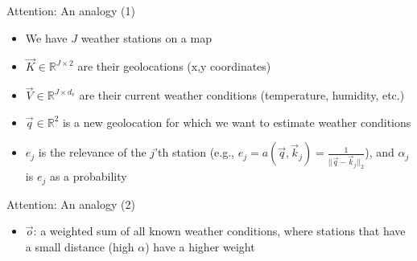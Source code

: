 
\begin{vbframe}{Attention: An analogy (1)}

\vfill

\begin{itemize}
\item We have $J$ weather stations on a map
\item $\vec K \in \mathbb{R}^{J\times 2}$ are their geolocations (x,y coordinates)
\item $\vec V \in \mathbb{R}^{J \times d_v}$ are their current weather conditions (temperature, humidity, etc.)
\item $\vec q \in \mathbb{R}^2$ is a new geolocation for which we want to estimate weather conditions
\item $e_j$ is the relevance of the $j$'th station (e.g., $e_j = a(\vec q, \vec k_j) = \frac{1}{||\vec q - \vec k_j||_2}$), and $\alpha_j$ is $e_j$ as a probability
\end{itemize}

\vfill

\end{vbframe}


\begin{vbframe}{Attention: An analogy (2)}

\vfill

\begin{itemize}
\item $\vec o$: a weighted sum of all known weather conditions, where stations that have a small distance (high $\alpha$) have a higher weight
\begin{center}
\end{center}
\end{itemize}

\vfill

\end{vbframe}

